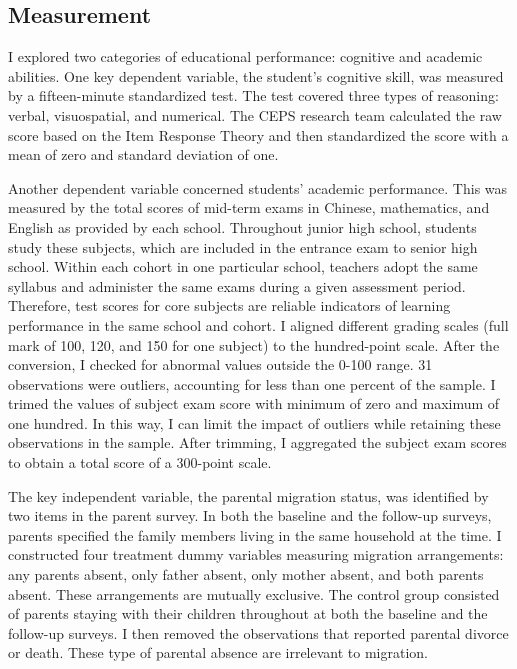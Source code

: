 \documentclass[
  man,floatsintext]{apa7}
\begin{document}
\hypertarget{measurement}{%
\subsection{Measurement}\label{measurement}}

I explored two categories of educational performance: cognitive and academic abilities. One key dependent variable, the student's cognitive skill, was measured by a fifteen-minute standardized test. The test covered three types of reasoning: verbal, visuospatial, and numerical. The CEPS research team calculated the raw score based on the Item Response Theory and then standardized the score with a mean of zero and standard deviation of one.

Another dependent variable concerned students' academic performance. This was measured by the total scores of mid-term exams in Chinese, mathematics, and English as provided by each school. Throughout junior high school, students study these subjects, which are included in the entrance exam to senior high school. Within each cohort in one particular school, teachers adopt the same syllabus and administer the same exams during a given assessment period. Therefore, test scores for core subjects are reliable indicators of learning performance in the same school and cohort. I aligned different grading scales (full mark of 100, 120, and 150 for one subject) to the hundred-point scale. After the conversion, I checked for abnormal values outside the 0-100 range. 31 observations were outliers, accounting for less than one percent of the sample. I trimed the values of subject exam score with minimum of zero and maximum of one hundred. In this way, I can limit the impact of outliers while retaining these observations in the sample. After trimming, I aggregated the subject exam scores to obtain a total score of a 300-point scale.

The key independent variable, the parental migration status, was identified by two items in the parent survey. In both the baseline and the follow-up surveys, parents specified the family members living in the same household at the time. I constructed four treatment dummy variables measuring migration arrangements: any parents absent, only father absent, only mother absent, and both parents absent. These arrangements are mutually exclusive. The control group consisted of parents staying with their children throughout at both the baseline and the follow-up surveys. I then removed the observations that reported parental divorce or death. These type of parental absence are irrelevant to migration.
\end{document}
